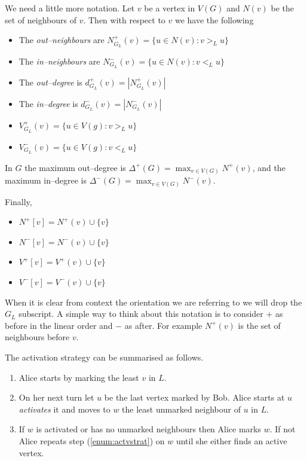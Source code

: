We need a little more notation. Let $v$ be a vertex in $V(G)$ and $N(v)$ be the set of neighbours of $v$. Then with respect to $v$ we have the following
\begin{itemize}        
    \item The \textit{out--neighbours} are $N^+_{G_L}(v)=\{u\in N(v):v>_L u\}$ 
    \item The \textit{in--neighbours} are $N^-_{G_L}(v)=\{u\in N(v):v<_L u\}$ 
    \item The \textit{out--degree} is $d^+_{G_L}(v)=|N^+_{G_L}(v)|$ 
    \item The \textit{in--degree} is $d^-_{G_L}(v)=|N^-_{G_L}(v)|$
    \item $V^+_{G_L}(v)=\{u\in V(g):v>_L u\}$     
    \item $V^-_{G_L}(v)=\{u\in V(g):v<_L u\}$ 
\end{itemize}

In $G$ the maximum out--degree is $\Delta^+(G)=\max_{v\in V(G)}N^+(v)$, and 
the maximum in--degree is $\Delta^-(G)=\max_{v\in V(G)}N^-(v)$. 

Finally,
\begin{itemize}  
    \item $N^+[v]=N^+(v)\cup\{v\}$
    \item $N^-[v]=N^-(v)\cup\{v\}$
    \item $V^+[v]=V^+(v)\cup\{v\}$
    \item $V^-[v]=V^-(v)\cup\{v\}$
\end{itemize}
When it is clear from context the orientation we are referring to we will drop the $G_L$ subscript.  A simple way to think about this notation is to consider $+$ as before in the linear order and $-$ as after. For example $N^+(v)$ is the set of neighbours before $v$.

The activation strategy can be summarised as follows. 
\begin{enumerate}
    \item Alice starts by marking the least $v$ in $L$.
    \item On her next turn let $u$ be the last vertex marked by Bob. Alice starts at $u$ \textit{activates} it and moves to $w$ the least unmarked neighbour of $u$ in $L$. \label{enum:actvstrat}
    \item If $w$ is activated or has no unmarked neighbours then Alice marks $w$. If not Alice repeats step (\ref{enum:actvstrat}) on $w$ until she either finds an active vertex.
\end{enumerate}


